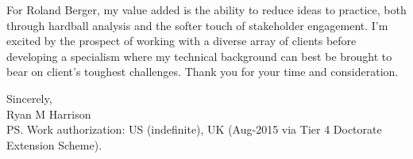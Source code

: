 \documentclass[a4paper]{../res}
\begin{document}
\begin{sloppypar}
\begin{resume}
For Roland Berger, my value added is the ability to reduce ideas to practice, both through hardball analysis and the softer touch of stakeholder engagement. I'm excited by the prospect of working with a diverse array of clients before developing a specialism where my technical background can best be brought to bear on client's toughest challenges. Thank you for your time and consideration.

Sincerely, \\
Ryan M Harrison \\
PS. Work authorization: US (indefinite), UK (Aug-2015 via Tier 4 Doctorate Extension Scheme). 


\end{resume} 
\end{sloppypar}
\end{document}
